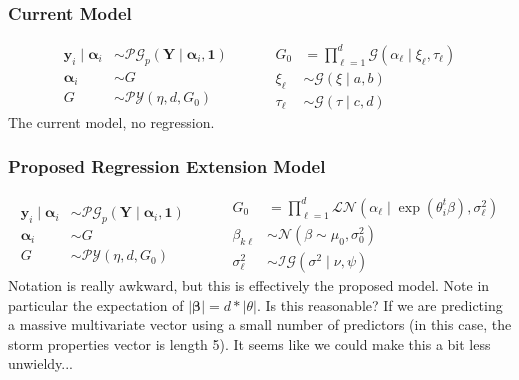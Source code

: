 \documentclass{article}
\begin{document}
\subsubsection*{Current Model}
\[
    \begin{aligned}
        \bm{y}_i \mid \bm{\alpha}_i &\sim
        \mathcal{PG}_p\left(\bm{Y}\mid\bm{\alpha}_i,\bm{1}\right)\\
        \bm{\alpha}_i &\sim G\\
        G &\sim \mathcal{PY}\left(\eta, d, G_0\right)        
    \end{aligned}
    ~\hspace{1cm}
    \begin{aligned}
        G_0 &= {\textstyle\prod}_{\ell = 1}^{d}\mathcal{G}(\alpha_{\ell}\mid \xi_{\ell},\tau_{\ell})\\
        \xi_{\ell} &\sim \mathcal{G}(\xi\mid a, b)\\
        \tau_{\ell} &\sim \mathcal{G}(\tau\mid c, d)
    \end{aligned}
\]
The current model, no regression.

\subsubsection*{Proposed Regression Extension Model}
\[
    \begin{aligned}
        \bm{y}_i \mid \bm{\alpha}_i &\sim
        \mathcal{PG}_p\left(\bm{Y}\mid\bm{\alpha}_i,\bm{1}\right)\\
        \bm{\alpha}_i &\sim G\\
        G &\sim \mathcal{PY}\left(\eta, d, G_0\right)
    \end{aligned}
    ~\hspace{1cm}
    \begin{aligned}
        G_0 &= {\textstyle\prod}_{\ell = 1}^{d}\mathcal{LN}(\alpha_{\ell}\mid \exp(\theta_i^t\beta), \sigma_{\ell}^2)\\
        \beta_{k\ell} &\sim \mathcal{N}(\beta\sim\mu_0,\sigma_0^2)\\
        \sigma_{\ell}^2 &\sim \mathcal{IG}(\sigma^2\mid\nu,\psi)
    \end{aligned}
\]
Notation is really awkward, but this is effectively the proposed model.  Note in particular the expectation of $\lvert \bm{\beta}\rvert = d * \lvert \theta\rvert$.  Is this reasonable?  If we are predicting a massive multivariate vector using a small number of predictors (in this case, the storm properties vector is length 5).  It seems like we could make this a bit less unwieldy...
\end{document}
